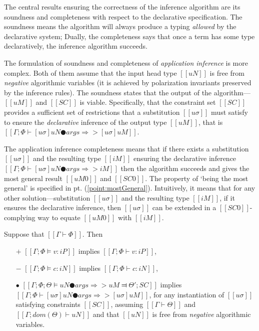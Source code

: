 \label{sec:proofs}
The central results ensuring the correctness of the inference algorithm are its soundness and completeness with respect to the declarative specification.
The soundness means the algorithm will always
produce a typing \emph{allowed} by the declarative system;
Dually, the completeness says that once a term has some type declaratively, the inference algorithm succeeds. 

The formulation of soundness and completeness of \emph{application inference} is more complex.
Both of them assume that the input head type $[[uN]]$ is free from \emph{negative}
algorithmic variables (it is achieved by polarization invariants preserved by the inference rules).
The soundness states that the output of the algorithm---$[[uM]]$ and $[[SC]]$ is viable. 
Specifically, that the constraint set $[[SC]]$ provides a sufficient set of restrictions that 
a substitution $[[uσ]]$ must satisfy to ensure the \emph{declarative} inference of the output type $[[uM]]$, that is 
$[[ Γ ; Φ ⊢ [uσ]uN ● args ⇒> [uσ]uM ]]$.

The application inference completeness means that if 
there exists a substitution $[[uσ]]$ and the resulting type $[[iM]]$
ensuring the declarative inference $[[Γ; Φ ⊢ [uσ]uN ● args ⇒> iM]]$ then the algorithm succeeds
and gives the most general result $[[uM0]]$ and $[[SC0]]$.
The property of `being the most general' is specified in pt. (\ref{point:mostGeneral}).
Intuitively, it means that for any other solution---substitution $[[uσ]]$ and the resulting type $[[iM]]$,
if it ensures the declarative inference, then $[[uσ]]$ can be extended in a $[[SC0]]$-complying way to equate 
$[[uM0]]$ with $[[iM]]$.


\begin{theorem*}
    \label{thm:soundness-typing}
    Suppose that $[[Γ ⊢ Φ]]$. Then\footnotemark[1]
    \hfill
    \begin{itemize}
        \item [$+$] $[[Γ; Φ ⊨ v : iP]]$ implies $[[Γ; Φ ⊢ v : iP]]$,
        \item [$-$] $[[Γ; Φ ⊨ c : iN]]$ implies $[[Γ; Φ ⊢ c : iN]]$,
        \item [$\bullet$] $[[Γ; Φ; Θ ⊨ uN ● args ⇒> uM ⫤ Θ'; SC]]$ implies $[[ Γ ; Φ ⊢ [uσ]uN ● args ⇒> [uσ]uM ]]$, 
            for any instantiation of $[[uσ]]$ satisfying constraints $[[SC]]$,
            assuming $[[Γ ⊢ Θ]]$ and $[[Γ; dom(Θ) ⊢ uN]]$ and that $[[uN]]$ is free from 
            \emph{negative} algorithmic variables.
    \end{itemize}
\end{theorem*}

